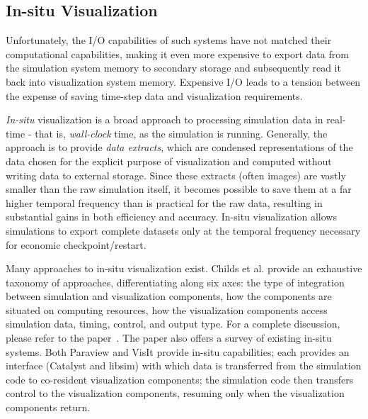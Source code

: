 \documentclass[journal]{IEEEtran}
\begin{document}
\subsection{In-situ Visualization}

Unfortunately, the I/O capabilities of such systems have not matched their computational capabilities, making it even more expensive to export data from the simulation system memory to secondary storage and subsequently read it back into visualization system memory.   Expensive I/O leads to a tension between the expense of saving time-step data and visualization requirements.
  
\textit{In-situ} visualization is a broad approach to processing simulation data in real-time - that is, \textit{wall-clock} time, as the simulation is running.  Generally, the approach is to provide \textit{data extracts}, which are condensed representations of the data chosen for the explicit purpose of visualization and computed without writing data to external storage.  Since these extracts (often images) are vastly smaller than the raw simulation itself, it becomes possible to save them at a far higher temporal frequency than is practical for the raw data, resulting in substantial gains in both efficiency and accuracy.  In-situ visualization allows simulations to export complete datasets only at the temporal frequency necessary for economic checkpoint/restart. 
 
Many approaches to in-situ visualization exist.  Childs et al.\cite{Childs:IJHPCA} provide an exhaustive taxonomy of approaches, differentiating along six axes: the type of integration between simulation and visualization components,  how the components are situated on computing resources, how the visualization components access simulation data, timing, control, and output type.  For a complete discussion, please refer to the paper~\cite{Childs:IJHPCA}.  The paper also offers a survey of existing in-situ systems.  Both Paraview and VisIt provide in-situ capabilities; each provides an interface (Catalyst and libsim) with which data is transferred from the simulation code to co-resident visualization components; the simulation code then transfers control to the visualization components, resuming only when the visualization components return.
 
\end{document}
